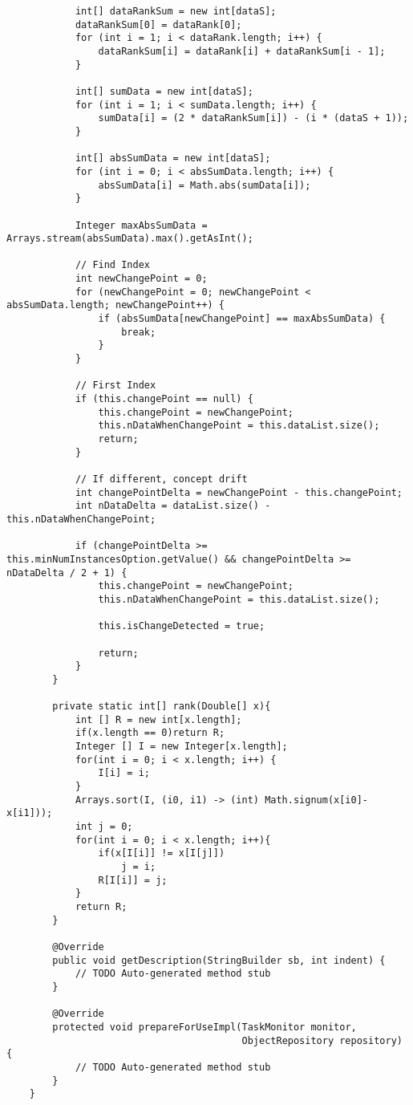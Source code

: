 \documentclass[qual, classic, a4paper]{ufbathesis}
\begin{document}
\begin{verbatim}
            int[] dataRankSum = new int[dataS];
            dataRankSum[0] = dataRank[0];
            for (int i = 1; i < dataRank.length; i++) {
                dataRankSum[i] = dataRank[i] + dataRankSum[i - 1];
            }
    
            int[] sumData = new int[dataS];
            for (int i = 1; i < sumData.length; i++) {
                sumData[i] = (2 * dataRankSum[i]) - (i * (dataS + 1));
            }
    
            int[] absSumData = new int[dataS];
            for (int i = 0; i < absSumData.length; i++) {
                absSumData[i] = Math.abs(sumData[i]);
            }
    
            Integer maxAbsSumData = Arrays.stream(absSumData).max().getAsInt();
    
            // Find Index
            int newChangePoint = 0;
            for (newChangePoint = 0; newChangePoint < absSumData.length; newChangePoint++) {
                if (absSumData[newChangePoint] == maxAbsSumData) {
                    break;
                }
            }
    
            // First Index
            if (this.changePoint == null) {
                this.changePoint = newChangePoint;
                this.nDataWhenChangePoint = this.dataList.size();
                return;
            }
    
            // If different, concept drift
            int changePointDelta = newChangePoint - this.changePoint;
            int nDataDelta = dataList.size() - this.nDataWhenChangePoint;
    
            if (changePointDelta >= this.minNumInstancesOption.getValue() && changePointDelta >= nDataDelta / 2 + 1) {
                this.changePoint = newChangePoint;
                this.nDataWhenChangePoint = this.dataList.size();
    
                this.isChangeDetected = true;
    
                return;
            }
        }
    
        private static int[] rank(Double[] x){
            int [] R = new int[x.length];
            if(x.length == 0)return R;
            Integer [] I = new Integer[x.length];
            for(int i = 0; i < x.length; i++) {
                I[i] = i;
            }
            Arrays.sort(I, (i0, i1) -> (int) Math.signum(x[i0]-x[i1]));
            int j = 0;
            for(int i = 0; i < x.length; i++){
                if(x[I[i]] != x[I[j]])
                    j = i;
                R[I[i]] = j;
            }
            return R;
        }
    
        @Override
        public void getDescription(StringBuilder sb, int indent) {
            // TODO Auto-generated method stub
        }
    
        @Override
        protected void prepareForUseImpl(TaskMonitor monitor,
                                         ObjectRepository repository) {
            // TODO Auto-generated method stub
        }
    }
\end{verbatim}
\end{document}
